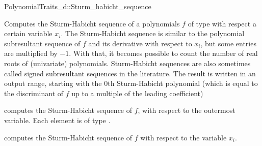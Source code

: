 \begin{ccRefConcept}{PolynomialTraits_d::Sturm_habicht_sequence}
\ccDefinition

Computes the Sturm-Habicht sequence of a polynomials $f$ of type 
 with respect a certain variable $x_i$.
The Sturm-Habicht sequence is similar to the polynomial subresultant sequence
of $f$ and its derivative with respect to $x_i$, but some entries
are multiplied by $-1$. With that, it becomes possible to count
the number of real roots of (univariate) polynomials.
Sturm-Habicht sequences are also sometimes 
called signed subresultant sequences in the literature.
The result is written in an output range, 
starting with the $0$th Sturm-Habicht polynomial (which is equal to
the discriminant of $f$ up to a multiple of the leading coefficient)

\ccOperations
{}
         { computes the Sturm-Habicht sequence of $f$, 
           with respect to the outermost variable. Each element is of type
           .}

         { computes the Sturm-Habicht sequence of $f$ 
           with respect to the variable $x_i$.}


\ccSeeAlso

\\
\\

\end{ccRefConcept}
